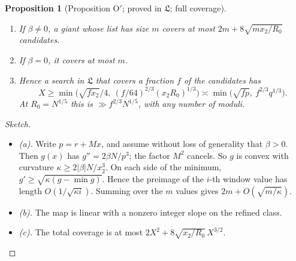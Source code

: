 \documentclass[11pt]{amsart}
\newtheorem{proposition}[theorem]{Proposition}
\theoremstyle{definition}
\begin{document}
\begin{proposition}[Proposition O$'$; proved in $\mathfrak L$; full coverage]\label{prop:Oprime}
\begin{enumerate}[label=(\alph*)]
\item If $\beta\ne0$, a giant whose list has size $m$ covers at most $2m+8\sqrt{mx_2/R_0}$
  candidates.
\item If $\beta=0$, it covers at most $m$.
\item Hence a search in $\mathfrak L$ that covers a fraction $f$ of the candidates has
  \[
  X\ge\min\bigl(\sqrt{fx_2}/4,\ (f/64)^{2/3}(x_2R_0)^{1/3}\bigr)\asymp\min\bigl(\sqrt{fp},\
  f^{2/3}q^{1/3}\bigr).
  \]
  At $R_0=N^{1/5}$ this is $\gg f^{2/3}N^{1/5}$, with any number of moduli.
\end{enumerate}
\end{proposition}
\begin{proof}[Sketch]
\begin{itemize}
\item \emph{(a).} Write $p=r+Mx$, and assume without loss of generality that $\beta>0$. Then
  $g(x)$ has $g''=2\beta N/p^3$; the factor $M^2$ cancels. So $g$ is convex with curvature $\kappa\ge2|\beta|N/x_2^3$. On each side of the minimum,
  $g'\ge\sqrt{\kappa(g-\min g)}$. Hence the preimage of the $i$-th window value has length
  $O(1/\sqrt{\kappa i})$. Summing over the $m$ values gives $2m+O(\sqrt{m/\kappa})$.
\item \emph{(b).} The map is linear with a nonzero integer slope on the refined class.
\item \emph{(c).} The total coverage is at most $2X^2+8\sqrt{x_2/R_0}\,X^{3/2}$.
\end{itemize}
\end{proof}
\end{document}
